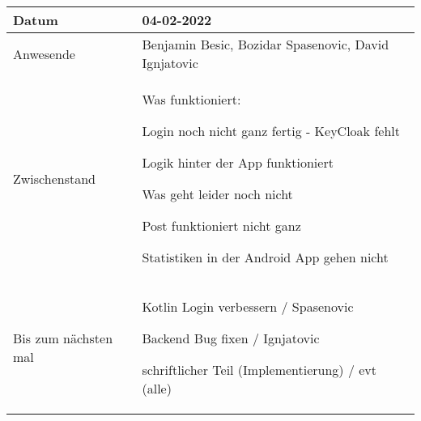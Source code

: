 \begin{center}
    \begin{tabular}{ |p{3cm}|p{10cm}|  }
        \hline
        Datum & 04-02-2022\\
        \hline
        Anwesende & Benjamin Besic, Bozidar Spasenovic, David Ignjatovic\\

        \hline
        Zwischenstand& 

        Was funktioniert:

    Login noch nicht ganz fertig - KeyCloak fehlt

    Logik hinter der App funktioniert

    Was geht leider noch nicht

    Post funktioniert nicht ganz

    Statistiken in der Android App gehen nicht




    
    \\
        \hline
        Bis zum nächsten mal & 





        Kotlin Login verbessern / Spasenovic

        Backend Bug fixen / Ignjatovic
    
        schriftlicher Teil (Implementierung) / evt (alle)
    
    


    
    
    
    \\
        \hline
    \end{tabular}
\end{center}
